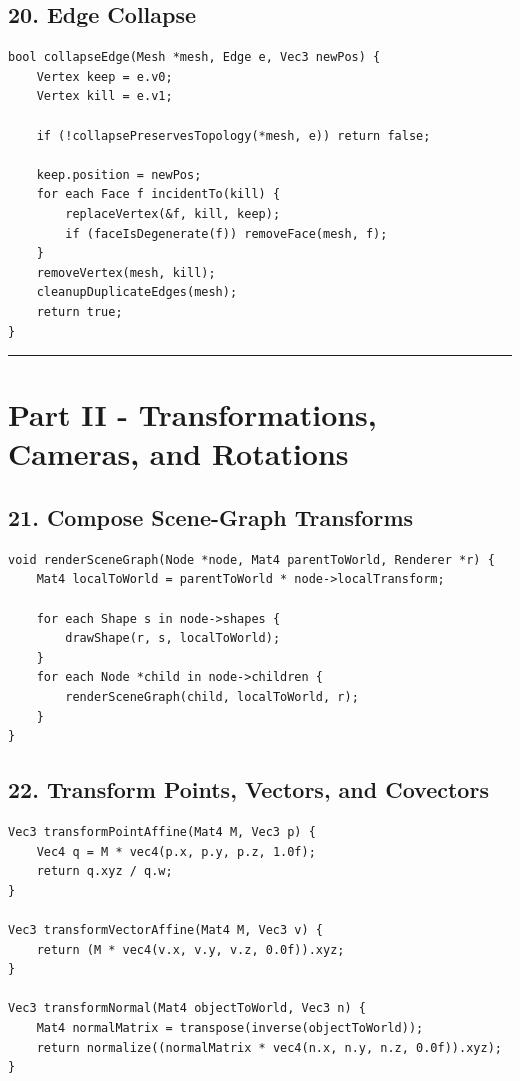 \documentclass[10pt,letterpaper]{article}
\begin{document}
\subsection{20. Edge Collapse}

\begin{verbatim}
bool collapseEdge(Mesh *mesh, Edge e, Vec3 newPos) {
    Vertex keep = e.v0;
    Vertex kill = e.v1;

    if (!collapsePreservesTopology(*mesh, e)) return false;

    keep.position = newPos;
    for each Face f incidentTo(kill) {
        replaceVertex(&f, kill, keep);
        if (faceIsDegenerate(f)) removeFace(mesh, f);
    }
    removeVertex(mesh, kill);
    cleanupDuplicateEdges(mesh);
    return true;
}
\end{verbatim}

\medskip\hrule\medskip

\clearpage
\section{Part II - Transformations, Cameras, and Rotations}

\subsection{21. Compose Scene-Graph Transforms}

\begin{verbatim}
void renderSceneGraph(Node *node, Mat4 parentToWorld, Renderer *r) {
    Mat4 localToWorld = parentToWorld * node->localTransform;

    for each Shape s in node->shapes {
        drawShape(r, s, localToWorld);
    }
    for each Node *child in node->children {
        renderSceneGraph(child, localToWorld, r);
    }
}
\end{verbatim}

\subsection{22. Transform Points, Vectors, and Covectors}

\begin{verbatim}
Vec3 transformPointAffine(Mat4 M, Vec3 p) {
    Vec4 q = M * vec4(p.x, p.y, p.z, 1.0f);
    return q.xyz / q.w;
}

Vec3 transformVectorAffine(Mat4 M, Vec3 v) {
    return (M * vec4(v.x, v.y, v.z, 0.0f)).xyz;
}

Vec3 transformNormal(Mat4 objectToWorld, Vec3 n) {
    Mat4 normalMatrix = transpose(inverse(objectToWorld));
    return normalize((normalMatrix * vec4(n.x, n.y, n.z, 0.0f)).xyz);
}
\end{verbatim}
\end{document}
